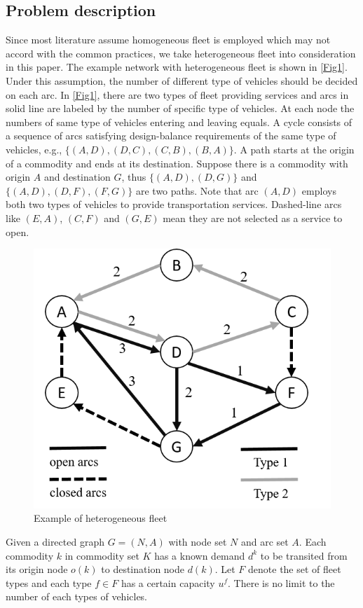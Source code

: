 \documentclass[11pt,nonblindrev,fleqn]{article}
\begin{document}
\subsection{Problem description}
Since most literature assume homogeneous fleet is employed which may not accord with the common practices, we take heterogeneous fleet into consideration in this paper. The example network with heterogeneous fleet is shown in \autoref{Fig1}. Under this assumption, the number of different type of vehicles should be decided on each arc. In \autoref{Fig1}, there are two types of fleet providing services and arcs in solid line are labeled by the number of specific type of vehicles. At each node the numbers of same type of vehicles entering and leaving equals. A cycle consists of a sequence of arcs satisfying design-balance requirements of the same type of vehicles, e.g., $\{ (A,D),(D,C),(C,B),(B,A) \}$. A path starts at the origin of a commodity and ends at its destination. Suppose there is a commodity with origin $A$ and destination $G$, thus $\{ (A,D),(D,G) \}$ and $\{ (A,D),(D,F),(F,G) \}$ are two paths. Note that arc $(A,D)$ employs both two types of vehicles to provide transportation services. Dashed-line arcs like $(E,A)$, $(C,F)$ and $(G,E)$ mean they are not selected as a service to open.

\begin{figure}[H]
\setlength{\abovecaptionskip}{-5pt}
\setlength{\belowcaptionskip}{-5pt}
\centering
\includegraphics[width=0.4\linewidth]{F1.png}
\caption{Example of heterogeneous fleet}
\label{Fig1}
\end{figure}

Given a directed graph $G=(N,A)$ with node set $N$ and arc set $A$. Each commodity $k$ in commodity set $K$ has a known demand $d^k$ to be transited from its origin node $o(k)$ to destination node $d(k)$. Let $F$ denote the set of fleet types and each type $f\in F$ has a certain capacity $u^f$. There is no limit to the number of each types of vehicles.
\end{document}
